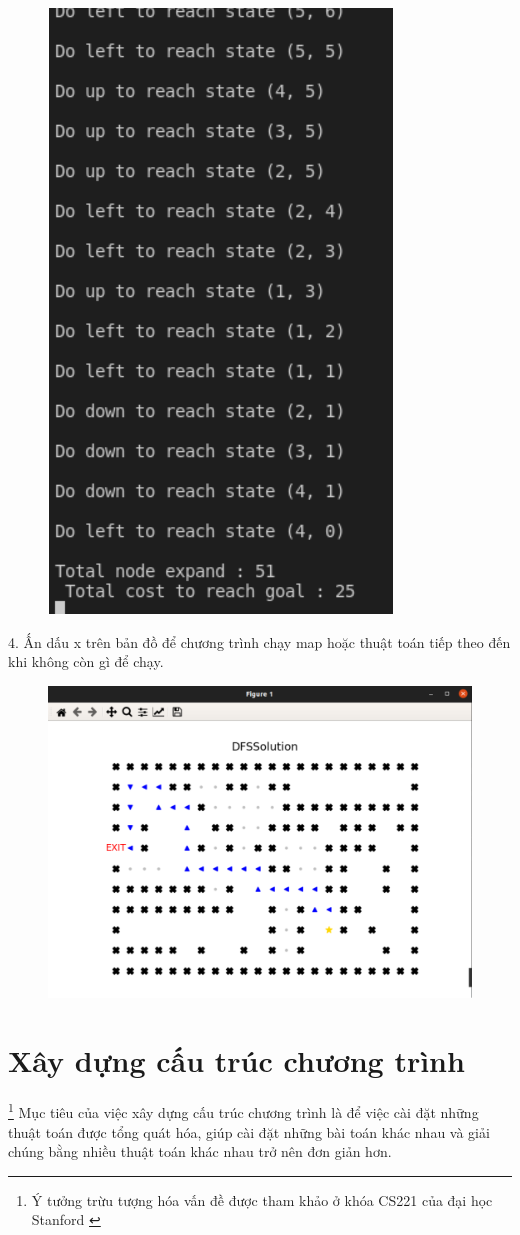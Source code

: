 \documentclass[11pt]{article} %
\begin{document}
\begin{figure}[h] 
	\centering
	\includegraphics[width=0.5\columnwidth]{Figures/hdsd_5.png}
\end{figure}

4. Ấn dấu x trên bản đồ để chương trình chạy map hoặc thuật toán tiếp theo đến khi không còn gì để chạy.\\
\newpage
\begin{figure}[h] 
	\centering
	\includegraphics[width=0.5\columnwidth]{Figures/hssd_2.png}
\end{figure}
\section{Xây dựng cấu trúc chương trình} 
\footnote{Ý tưởng trừu tượng hóa vấn đề được tham khảo ở khóa CS221 của đại học Stanford \cite{standfordcs221}}
Mục tiêu của việc xây dựng cấu trúc chương trình là để việc cài đặt những thuật toán được tổng quát hóa, giúp cài đặt những bài toán khác nhau và giải chúng bằng nhiều thuật toán khác nhau trở nên đơn giản hơn. 
\end{document}
